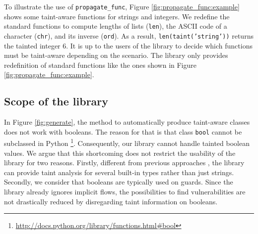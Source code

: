 \documentclass[oribibl]{llncs}
\newcommand{\nametklass}{taint-aware }
\begin{document}
To illustrate the use of \texttt{propagate\_func}, Figure
\ref{fig:propagate_func:example} shows 
some \nametklass functions 
for strings and integers. We redefine the standard functions to 
compute lengths of lists (\texttt{len}), the ASCII code of a character
(\texttt{chr}), and its inverse (\texttt{ord}). As a result, 
\texttt{len(taint('string'))} returns the tainted integer 6.
It is up to the users 
of the library to decide which functions must be \nametklass depending
on the scenario.
The library only provides 
redefinition of standard functions 
like the ones 
shown in Figure \ref{fig:propagate_func:example}.


\subsection{Scope of the library}

In Figure \ref{fig:generate}, 
the method to automatically produce \nametklass classes does not 
work with booleans. 
The reason for that is that class \texttt{bool}
cannot be subclassed in Python 
\footnote{\url{http://docs.python.org/library/functions.html#bool}}.
Consequently, our library
cannot handle tainted boolean values. We argue that 
this shortcoming does not restrict the usability of the library for
 two reasons. Firstly, different from previous approaches 
\cite{Perl,Nguyen05,Jovanovic06pixy:a,KozlovPetukhov07,Futo07,SeoLam2010}, 
the library can provide taint analysis for several 
built-in types rather than just strings. Secondly, we consider that 
booleans are typically used on guards. 
Since the library already ignores implicit flows, 
the possibilities to find vulnerabilities
are not drastically reduced by disregarding taint information on booleans.
\end{document}
